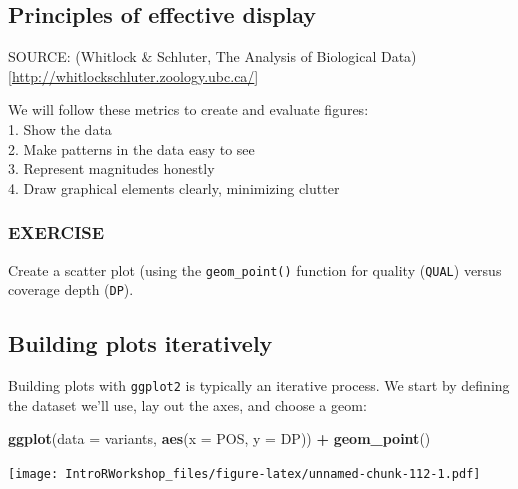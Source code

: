 \documentclass[]{book}
\newenvironment{Shaded}{\begin{snugshade}}{\end{snugshade}}
\newcommand{\DataTypeTok}[1]{\textcolor[rgb]{0.13,0.29,0.53}{#1}}
\newcommand{\KeywordTok}[1]{\textcolor[rgb]{0.13,0.29,0.53}{\textbf{#1}}}
\newcommand{\NormalTok}[1]{#1}
\newcommand{\OperatorTok}[1]{\textcolor[rgb]{0.81,0.36,0.00}{\textbf{#1}}}
\newcommand{\StringTok}[1]{\textcolor[rgb]{0.31,0.60,0.02}{#1}}
\begin{document}
\hypertarget{principles-of-effective-display}{%
\subsection*{Principles of effective display}\label{principles-of-effective-display}}

SOURCE: (Whitlock \& Schluter, The Analysis of Biological Data){[}\url{http://whitlockschluter.zoology.ubc.ca/}{]}

We will follow these metrics to create and evaluate figures:\\
1. Show the data\\
2. Make patterns in the data easy to see\\
3. Represent magnitudes honestly\\
4. Draw graphical elements clearly, minimizing clutter

\hypertarget{exercise-23}{%
\subsubsection*{EXERCISE}\label{exercise-23}}

Create a scatter plot (using the \texttt{geom\_point()} function for quality (\texttt{QUAL}) versus coverage depth (\texttt{DP}).

\hypertarget{building-plots-iteratively}{%
\subsection*{Building plots iteratively}\label{building-plots-iteratively}}

Building plots with \texttt{ggplot2} is typically an iterative process. We start by defining the dataset we'll use, lay out the axes, and choose a geom:

\begin{Shaded}
\begin{Highlighting}[]
\KeywordTok{ggplot}\NormalTok{(}\DataTypeTok{data =}\NormalTok{ variants, }\KeywordTok{aes}\NormalTok{(}\DataTypeTok{x =}\NormalTok{ POS, }\DataTypeTok{y =}\NormalTok{ DP)) }\OperatorTok{+}\StringTok{ }
\StringTok{  }\KeywordTok{geom_point}\NormalTok{()}
\end{Highlighting}
\end{Shaded}

\texttt{[image: IntroRWorkshop\_files/figure-latex/unnamed-chunk-112-1.pdf]}
\end{document}
